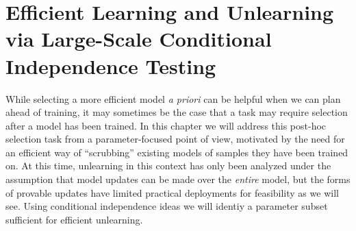 \chapter{Efficient Learning and Unlearning via Large-Scale Conditional Independence Testing} \label{chap:lcodec} 

While selecting a more efficient model \textit{a priori}
can be helpful when we can plan ahead of training,
it may sometimes be the case
that a task may require selection
after a model has been trained.
In this chapter we will 
address this post-hoc selection task
from a parameter-focused point of view,
motivated by the need for an efficient way of 
``scrubbing'' existing models of samples
they have been trained on.
At this time, unlearning in this context has
only been analyzed under the assumption
that model updates can be made over the \textit{entire} model, but the forms of provable updates have limited
practical deployments for feasibility
as we will see.
Using conditional independence ideas
we will identiy a parameter subset sufficient for
efficient unlearning.









